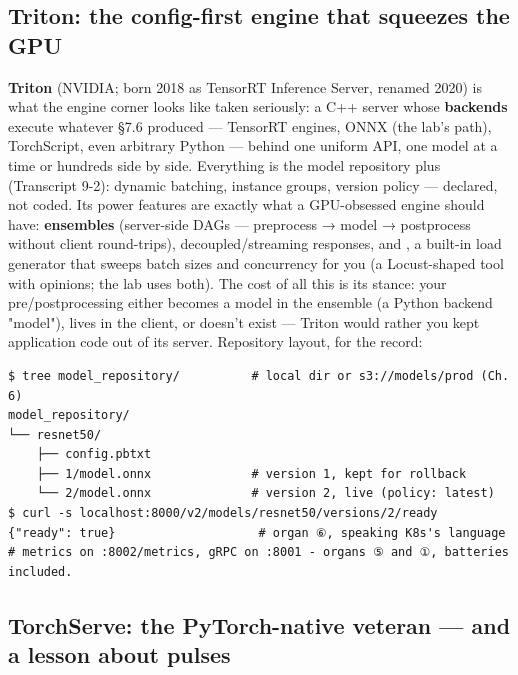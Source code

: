 \subsection*{Triton: the config-first engine that squeezes the GPU}

\textbf{Triton} (NVIDIA; born 2018 as TensorRT Inference Server, renamed 2020) is what the engine corner looks like taken seriously: a C++ server whose \textbf{backends} execute whatever §7.6 produced — TensorRT engines, ONNX (the lab's path), TorchScript, even arbitrary Python — behind one uniform API, one model at a time or hundreds side by side. Everything is the model repository plus  (Transcript 9-2): dynamic batching, instance groups, version policy — declared, not coded. Its power features are exactly what a GPU-obsessed engine should have: \textbf{ensembles} (server-side DAGs — preprocess → model → postprocess without client round-trips), decoupled/streaming responses, and , a built-in load generator that sweeps batch sizes and concurrency for you (a Locust-shaped tool with opinions; the lab uses both). The cost of all this is its stance: your pre/postprocessing either becomes a model in the ensemble (a Python backend "model"), lives in the client, or doesn't exist — Triton would rather you kept application code out of its server. Repository layout, for the record:

\begin{terminalbox}
\begin{Verbatim}[breaklines=true,breakanywhere=true,fontsize=\small,formatcom=\color{tbbtermfg},codes=\tbbcodeactive]
$ tree model_repository/          # local dir or s3://models/prod (Ch. 6)
model_repository/
└── resnet50/
    ├── config.pbtxt
    ├── 1/model.onnx              # version 1, kept for rollback
    └── 2/model.onnx              # version 2, live (policy: latest)
$ curl -s localhost:8000/v2/models/resnet50/versions/2/ready
{"ready": true}                    # organ ⑥, speaking K8s's language
# metrics on :8002/metrics, gRPC on :8001 - organs ⑤ and ①, batteries included.
\end{Verbatim}
\end{terminalbox}

\subsection*{TorchServe: the PyTorch-native veteran — and a lesson about pulses}

